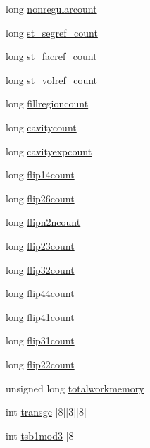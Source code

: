 \begin{DoxyCompactItemize}
long \hyperlink{classtetgenmesh_a6619cdb6b99ed8546f2007c48b65ca3a}{nonregularcount}
\item 
long \hyperlink{classtetgenmesh_ac2b943e3323faea3af2521fede229024}{st\-\_\-segref\-\_\-count}
\item 
long \hyperlink{classtetgenmesh_aa6a2b877259f953e10e48bfa4788ef83}{st\-\_\-facref\-\_\-count}
\item 
long \hyperlink{classtetgenmesh_afa7b63c64990d773c22700fd9022bbdd}{st\-\_\-volref\-\_\-count}
\item 
long \hyperlink{classtetgenmesh_a0a8e70333a9912cb0e212bc9d7ec648f}{fillregioncount}
\item 
long \hyperlink{classtetgenmesh_af6bc7f6e64840197bc176a96da325c5c}{cavitycount}
\item 
long \hyperlink{classtetgenmesh_ac1011e5e52346d8829d4be2d370054eb}{cavityexpcount}
\item 
long \hyperlink{classtetgenmesh_adb10987252049a6ea2f1959a5f0f2c50}{flip14count}
\item 
long \hyperlink{classtetgenmesh_a5afc9b75a5a2418f795ff0ea13793f74}{flip26count}
\item 
long \hyperlink{classtetgenmesh_a7936b404bc33e830d0a7f80737f3fdf8}{flipn2ncount}
\item 
long \hyperlink{classtetgenmesh_a3a939ba7f8ecfe66e9c7889126df3c92}{flip23count}
\item 
long \hyperlink{classtetgenmesh_acbddc46c3d6f1a3c9cc160cd39ba674f}{flip32count}
\item 
long \hyperlink{classtetgenmesh_a84660f45542f2f8c6609fceb8ad00615}{flip44count}
\item 
long \hyperlink{classtetgenmesh_accf2261a6d043618bfbb7af3368eae51}{flip41count}
\item 
long \hyperlink{classtetgenmesh_a1970580330b0ef8b71a6afb16a255a50}{flip31count}
\item 
long \hyperlink{classtetgenmesh_a3d8ebbb8bbacdd0d1cfc899cf40caab3}{flip22count}
\item 
unsigned long \hyperlink{classtetgenmesh_a67341ca5f2c0ece12052d62316f99363}{totalworkmemory}
\item 
int \hyperlink{classtetgenmesh_a606af36503a05864a66eed7887031f92}{transgc} \mbox{[}8\mbox{]}\mbox{[}3\mbox{]}\mbox{[}8\mbox{]}
\item 
int \hyperlink{classtetgenmesh_abcdcec3f841610fe91a0160b4e3a838e}{tsb1mod3} \mbox{[}8\mbox{]}
\end{DoxyCompactItemize}
